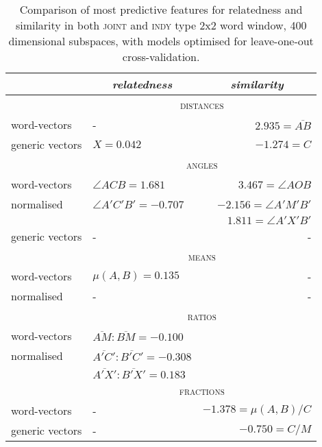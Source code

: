 \begin{table}
\centering
\begin{tabular}{llr}
\hline
& \multicolumn{1}{c}{\emph{relatedness}} & \multicolumn{1}{c}{\emph{similarity}} \\
\hline
& \multicolumn{2}{c}{\textsc{distances}} \\
word-vectors & - & $2.935 = \overline{AB}$ \\
generic vectors & $X = 0.042$ & $-1.274 = C$ \\
\hline
& \multicolumn{2}{c}{\textsc{angles}} \\
word-vectors & $\angle ACB = 1.681$ & $3.467 = \angle AOB$ \\
normalised & $\angle A'C'B' = -0.707$ & $-2.156 = \angle A'M'B'$ \\
& & $1.811 = \angle A'X'B'$ \\
generic vectors & - & - \\
\hline
& \multicolumn{2}{c}{\textsc{means}} \\
word-vectors & $\mu(A,B) = 0.135$ & - \\
normalised & - & - \\
\hline
& \multicolumn{2}{c}{\textsc{ratios}} \\
word-vectors & $\overline{AM}:\overline{BM} = -0.100$ \\
normalised & $\overline{A'C'}:\overline{B'C'} = -0.308$ \\
& $\overline{A'X'}:\overline{B'X'} = 0.183$ \\
\hline
& \multicolumn{2}{c}{\textsc{fractions}} \\
word-vectors & - & $-1.378 = \mu(A,B)/C$ \\
generic vectors & - & $-0.750 = C/M$ \\
\hline
\end{tabular}
\caption{Comparison of most predictive features for relatedness and similarity in both \textsc{joint} and \textsc{indy} type 2x2 word window, 400 dimensional subspaces, with models optimised for leave-one-out cross-validation.}
\label{tab:features}
\end{table}

